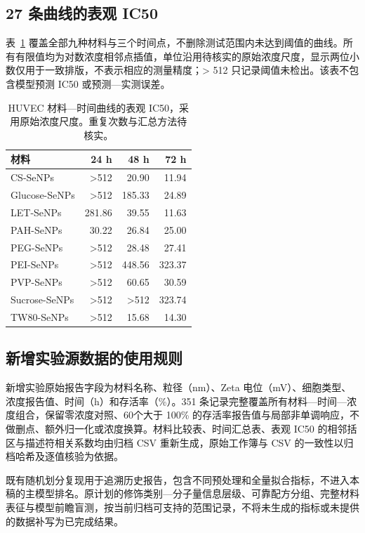 \documentclass[letterpaper]{article}
\begin{document}
\subsection{27 条曲线的表观 IC50}

表~\ref{tab:huvec_ic50} 覆盖全部九种材料与三个时间点，不删除测试范围内未达到阈值的曲线。所有有限值均为对数浓度相邻点插值，单位沿用待核实的原始浓度尺度，显示两位小数仅用于一致排版，不表示相应的测量精度；> 512 只记录阈值未检出。该表不包含模型预测 IC50 或预测—实测误差。

\begin{table}[H]
\centering
\caption{HUVEC 材料—时间曲线的表观 IC50，采用原始浓度尺度。重复次数与汇总方法待核实。}
\label{tab:huvec_ic50}
\small
\begin{tabular}{lrrr}
\toprule
材料 & 24 h & 48 h & 72 h \\
\midrule
CS-SeNPs & >512 & 20.90 & 11.94 \\
Glucose-SeNPs & >512 & 185.33 & 24.89 \\
LET-SeNPs & 281.86 & 39.55 & 11.63 \\
PAH-SeNPs & 30.22 & 26.84 & 25.00 \\
PEG-SeNPs & >512 & 28.48 & 27.41 \\
PEI-SeNPs & >512 & 448.56 & 323.37 \\
PVP-SeNPs & >512 & 60.65 & 30.59 \\
Sucrose-SeNPs & >512 & >512 & 323.74 \\
TW80-SeNPs & >512 & 15.68 & 14.30 \\
\bottomrule
\end{tabular}

\end{table}

\subsection{新增实验源数据的使用规则}

新增实验原始报告字段为材料名称、粒径（nm）、Zeta 电位（mV）、细胞类型、浓度报告值、时间（h）和存活率（\%）。351 条记录完整覆盖所有材料—时间—浓度组合，保留零浓度对照、60个大于 100\% 的存活率报告值与局部非单调响应，不做删点、额外归一化或浓度换算。材料比较表、时间汇总表、表观 IC50 的相邻括区与描述符相关系数均由归档 CSV 重新生成，原始工作簿与 CSV 的一致性以归档哈希及逐值核验为依据。

既有随机划分复现用于追溯历史报告，包含不同预处理和全量拟合指标，不进入本稿的主模型排名。原计划的修饰类别—分子量信息层级、可靠配方分组、完整材料表征与模型前瞻盲测，按当前归档可支持的范围记录，不将未生成的指标或未提供的数据补写为已完成结果。
\end{document}
